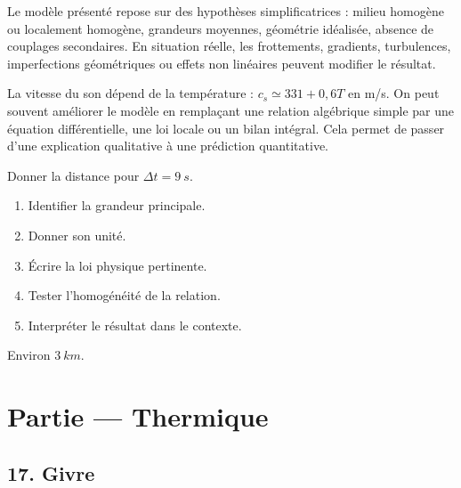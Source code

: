 \documentclass[11pt,a4paper]{article}
\begin{document}
\begin{attentionbox}
Le modèle présenté repose sur des hypothèses simplificatrices : milieu homogène ou localement homogène, grandeurs moyennes, géométrie idéalisée, absence de couplages secondaires. En situation réelle, les frottements, gradients, turbulences, imperfections géométriques ou effets non linéaires peuvent modifier le résultat.
\end{attentionbox}

\begin{approfondissementbox}
La vitesse du son dépend de la température : $c_s\simeq331+0{,}6T$ en m/s.
On peut souvent améliorer le modèle en remplaçant une relation algébrique simple par une équation différentielle, une loi locale ou un bilan intégral. Cela permet de passer d'une explication qualitative à une prédiction quantitative.
\end{approfondissementbox}

\begin{exercicebox}
Donner la distance pour $\Delta t=\SI{9}{s}$.
\begin{enumerate}
  \item Identifier la grandeur principale.
  \item Donner son unité.
  \item Écrire la loi physique pertinente.
  \item Tester l'homogénéité de la relation.
  \item Interpréter le résultat dans le contexte.
\end{enumerate}
\end{exercicebox}

\begin{corrigebox}[Indication]
Environ $\SI{3}{km}$.
\end{corrigebox}


\section{Partie — Thermique}


\subsection{17. Givre}
\end{document}
